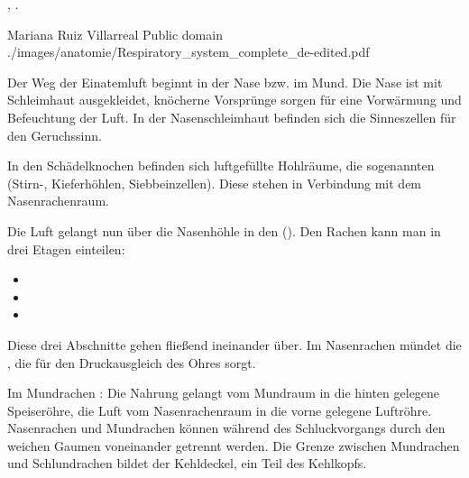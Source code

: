   ,  .
%
\label{topic:atemwege-lunge}%




{}%
{\label{fig:respiraktionstrakt-uebersicht}}%
{Mariana Ruiz Villarreal}%
{Public domain}%
{./images/anatomie/Respiratory_system_complete_de-edited.pdf}%
{}%
{}%



{%
Der Weg der Einatemluft beginnt in der Nase bzw. im Mund. 
%
Die Nase ist mit Schleimhaut ausgekleidet, 
knöcherne Vorsprünge sorgen für 
eine Vorwärmung 
und Befeuchtung der Luft. 
%
In der Nasenschleimhaut be\-finden sich die Sinneszellen für den Geruchssinn. 

In den Schädelknochen befinden sich luft\-ge\-füllte Hohlräume, 
die so\-genannten  
(Stirn-, Kiefer\-höhlen, Siebbeinzellen). 
%
Diese stehen in Verbindung mit dem Nasenrachenraum.
%



Die Luft gelangt nun über die Nasenhöhle in den 
(). 
%
Den Rachen kann man in drei Etagen einteilen:
\begin{itemize}
  \item {} 
  \item {} 
  \item {} 
\end{itemize}
Diese drei Abschnitte gehen fließend ineinander über. Im
Nasenrachen mündet die , die für den Druckausgleich
des Ohres sorgt. 

Im Mundrachen : Die Nahrung gelangt vom
Mundraum in die hinten gelegene Speiseröhre, die Luft
vom Nasenrachenraum in die vorne gelegene Luftröhre.
Nasenrachen und Mundrachen können während des
Schluckvorgangs durch den weichen Gaumen voneinander
getrennt werden. Die Grenze zwischen Mundrachen und
Schlundrachen bildet der Kehldeckel, ein Teil des Kehlkopfs.

}
